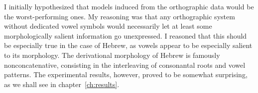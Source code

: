 I initially hypothesized that models induced from the orthographic 
data would be the worst-performing ones. My reasoning was that any orthographic system without dedicated vowel symbols would necessarily let at least some morphologically salient information go unexpressed. I reasoned that this should be especially true in the case of Hebrew, as vowels appear to be especially salient to its morphology. %
The derivational morphology of Hebrew is famously nonconcatenative, consisting in the interleaving of consonantal 
roots and vowel patterns. The experimental results, however, proved to be somewhat surprising, 
as we shall see in chapter~\ref{ch:results}.


